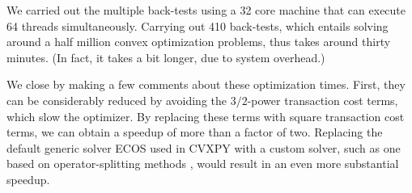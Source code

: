 \documentclass[openany]{article}  %
\begin{document}
We carried out the multiple back-tests using a 32 core machine that can execute
64 threads simultaneously.
Carrying out 410 back-tests, which entails solving around a half million convex
optimization problems, thus takes around thirty minutes. (In fact, it takes a bit
longer, due to system overhead.)

We close by making a few comments about these optimization times.  First, they can
be considerably reduced by avoiding the $3/2$-power transaction cost terms, which
slow the optimizer.  By replacing these terms with square transaction cost terms,
we can obtain a speedup of more than a factor of two.
Replacing the default generic solver ECOS \cite{domahidi2013ecos} used in CVXPY
with a custom solver, such as one based on
operator-splitting methods \cite{boyd2011distributed},
would result in an even more substantial speedup.

\backmatter


\end{document}
